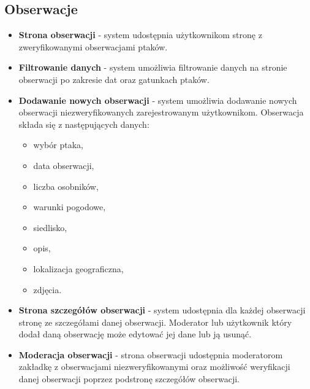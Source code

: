 \subsection{Obserwacje}
\begin{itemize}
	\item \textbf{Strona obserwacji} - system udostępnia użytkownikom stronę z zweryfikowanymi obserwacjami ptaków.
	\item \textbf{Filtrowanie danych} - system umożliwia filtrowanie danych na stronie obserwacji po zakresie dat oraz gatunkach ptaków.
	\item \textbf{Dodawanie nowych obserwacji} - system umożliwia dodawanie nowych obserwacji niezweryfikowanych zarejestrowanym użytkownikom. Obserwacja składa się z następujących danych:
	\begin{itemize}
		\item wybór ptaka,
		\item data obserwacji,
		\item liczba osobników,
		\item warunki pogodowe,
		\item siedlisko,
		\item opis,
		\item lokalizacja geograficzna,
		\item zdjęcia.
	\end{itemize}
	\item \textbf{Strona szczegółów obserwacji} - system udostępnia dla każdej obserwacji stronę ze szczegółami danej obserwacji.
		Moderator lub użytkownik który dodał daną obserwację może edytować jej dane lub ją usunąć.
	\item \textbf{Moderacja obserwacji} - strona obserwacji udostępnia moderatorom zakładkę z obserwacjami niezweryfikowanymi oraz możliwość weryfikacji danej obserwacji poprzez podstronę szczegółów obserwacji.
\end{itemize}


